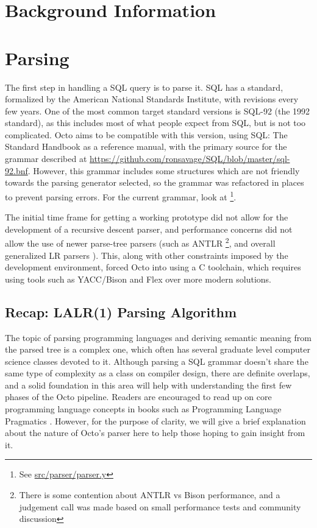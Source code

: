 \documentclass[]{article}
\newcommand{\gitlab}[1]{\footnote{See \href{https://gitlab.com/YottaDB/DBMS/YDBOcto/blob/master/#1}{#1}}}
\begin{document}
\section{Background Information}


\section{Parsing} \label{sec:parsing}

The first step in handling a SQL query is to parse it.
SQL has a standard, formalized by the American National Standards Institute, with revisions every few years.
One of the most common target standard versions is SQL-92 (the 1992 standard), as this includes most of what people expect from SQL, but is not too complicated.
Octo aims to be compatible with this version, using SQL: The Standard Handbook \cite{cannan1993sql} as a reference manual, with the primary source for the grammar described at \url{https://github.com/ronsavage/SQL/blob/master/sql-92.bnf}\cite{ronsavage2003sql}.
However, this grammar includes some structures which are not friendly towards the parsing generator selected, so the grammar was refactored in places to prevent parsing errors.
For the current grammar, look at \gitlab{src/parser/parser.y}.

The initial time frame for getting a working prototype did not allow for the development of a recursive descent parser, and performance concerns did not allow the use of newer parse-tree parsers (such as ANTLR \cite{parr2013definitive} \footnote{There is some contention about ANTLR vs Bison performance, and a judgement call was made based on small performance tests and community discussion}, and overall generalized LR parsers \cite{lang1974deterministic}).
This, along with other constraints imposed by the development environment, forced Octo into using a C toolchain, which requires using tools such as YACC/Bison and Flex over more modern solutions.

\subsection{Recap: LALR(1) Parsing Algorithm}

The topic of parsing programming languages and deriving semantic meaning from the parsed tree is a complex one, which often has several graduate level computer science classes devoted to it.
Although parsing a SQL grammar doesn't share the same type of complexity as a class on compiler design, there are definite overlaps, and a solid foundation in this area will help with understanding the first few phases of the Octo pipeline.
Readers are encouraged to read up on core programming language concepts in books such as Programming Language Pragmatics \cite{scott2000programming}.
However, for the purpose of clarity, we will give a brief explanation about the nature of Octo's parser here to help those hoping to gain insight from it.
\end{document}
